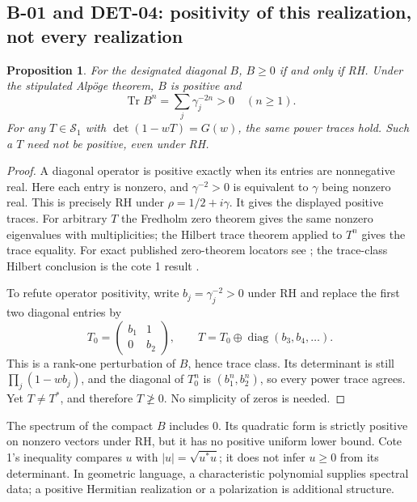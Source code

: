 \documentclass[11pt,a4paper]{article}
\newcommand{\Tr}{\operatorname{Tr}}
\newcommand{\diag}{\operatorname{diag}}
\newcommand{\Sone}{\mathcal S_1}
\newtheorem*{proposition}{Proposition}
\begin{document}
\subsection{B-01 and DET-04: positivity of this realization, not every realization}
\begin{proposition}
For the designated diagonal $B$, $B\ge0$ if and only if RH. Under the stipulated Alp\"oge theorem, $B$ is positive and
\[
 \Tr B^n=\sum_j\gamma_j^{-2n}>0\quad(n\ge1).
\]
For any $T\in\Sone$ with $\det(1-wT)=G(w)$, the same power traces hold. Such a $T$ need not be positive, even under RH.
\end{proposition}
\begin{proof}
A diagonal operator is positive exactly when its entries are nonnegative real. Here each entry is nonzero, and $\gamma^{-2}>0$ is equivalent to $\gamma$ being nonzero real. This is precisely RH under $\rho=1/2+i\gamma$. It gives the displayed positive traces. For arbitrary $T$ the Fredholm zero theorem gives the same nonzero eigenvalues with multiplicities; the Hilbert trace theorem applied to $T^n$ gives the trace equality. For exact published zero-theorem locators see \cite[ch.~II, \S4, Theorems 2 and 4, pp.~354 and 359]{groth56}; the trace-class Hilbert conclusion is the cote 1 result \cite{archive}.

To refute operator positivity, write $b_j=\gamma_j^{-2}>0$ under RH and replace the first two diagonal entries by
\[
 T_0=\begin{pmatrix}b_1&1\\0&b_2\end{pmatrix},\qquad
 T=T_0\oplus\diag(b_3,b_4,\ldots).
\]
This is a rank-one perturbation of $B$, hence trace class. Its determinant is still $\prod_j(1-wb_j)$, and the diagonal of $T_0^n$ is $(b_1^n,b_2^n)$, so every power trace agrees. Yet $T\ne T^*$, and therefore $T\not\ge0$. No simplicity of zeros is needed.
\end{proof}
The spectrum of the compact $B$ includes $0$. Its quadratic form is strictly positive on nonzero vectors under RH, but it has no positive uniform lower bound. Cote 1's inequality compares $u$ with $|u|=\sqrt{u^*u}$; it does not infer $u\ge0$ from its determinant. In geometric language, a characteristic polynomial supplies spectral data; a positive Hermitian realization or a polarization is additional structure.
\end{document}
